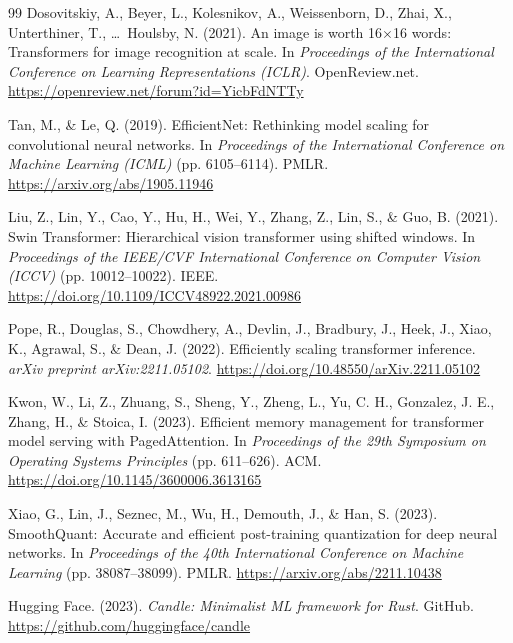 \documentclass[10pt,twocolumn,a4paper]{article}
\theoremstyle{definition}
\theoremstyle{plain}
\begin{document}
\begin{thebibliography}{99}
Dosovitskiy, A., Beyer, L., Kolesnikov, A., Weissenborn, D., Zhai, X., Unterthiner, T., \ldots\ Houlsby, N. (2021).
\newblock An image is worth 16$\times$16 words: Transformers for image recognition at scale.
\newblock In \textit{Proceedings of the International Conference on Learning Representations (ICLR)}. OpenReview.net. \url{https://openreview.net/forum?id=YicbFdNTTy}

Tan, M., \& Le, Q. (2019).
\newblock EfficientNet: Rethinking model scaling for convolutional neural networks.
\newblock In \textit{Proceedings of the International Conference on Machine Learning (ICML)} (pp. 6105--6114). PMLR. \url{https://arxiv.org/abs/1905.11946}

Liu, Z., Lin, Y., Cao, Y., Hu, H., Wei, Y., Zhang, Z., Lin, S., \& Guo, B. (2021).
\newblock Swin Transformer: Hierarchical vision transformer using shifted windows.
\newblock In \textit{Proceedings of the IEEE/CVF International Conference on Computer Vision (ICCV)} (pp. 10012--10022). IEEE. \url{https://doi.org/10.1109/ICCV48922.2021.00986}

Pope, R., Douglas, S., Chowdhery, A., Devlin, J., Bradbury, J., Heek, J., Xiao, K., Agrawal, S., \& Dean, J. (2022).
\newblock Efficiently scaling transformer inference.
\newblock \textit{arXiv preprint arXiv:2211.05102}. \url{https://doi.org/10.48550/arXiv.2211.05102}

Kwon, W., Li, Z., Zhuang, S., Sheng, Y., Zheng, L., Yu, C. H., Gonzalez, J. E., Zhang, H., \& Stoica, I. (2023).
\newblock Efficient memory management for transformer model serving with PagedAttention.
\newblock In \textit{Proceedings of the 29th Symposium on Operating Systems Principles} (pp. 611--626). ACM. \url{https://doi.org/10.1145/3600006.3613165}

Xiao, G., Lin, J., Seznec, M., Wu, H., Demouth, J., \& Han, S. (2023).
\newblock SmoothQuant: Accurate and efficient post-training quantization for deep neural networks.
\newblock In \textit{Proceedings of the 40th International Conference on Machine Learning} (pp. 38087--38099). PMLR. \url{https://arxiv.org/abs/2211.10438}

Hugging Face. (2023).
\newblock \textit{Candle: Minimalist ML framework for Rust}.
\newblock GitHub. \url{https://github.com/huggingface/candle}


\end{thebibliography}
\end{document}
